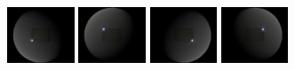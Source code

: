 \includegraphics[width=0.150\textwidth]{ch-psfcn/images/Method/Ball_Normalized/4.0_1_1_40.png}
\includegraphics[width=0.150\textwidth]{ch-psfcn/images/Method/Ball_Normalized/4.0_1_1_47.png}
\includegraphics[width=0.150\textwidth]{ch-psfcn/images/Method/Ball_Normalized/4.0_1_1_88.png}
\includegraphics[width=0.150\textwidth]{ch-psfcn/images/Method/Ball_Normalized/4.0_1_1_95.png}
\\
